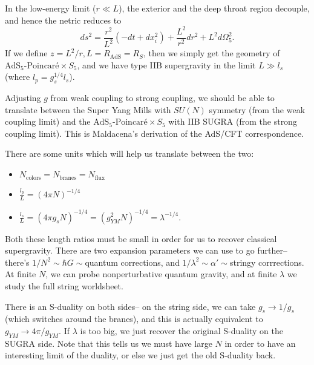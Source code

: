 In the low-energy limit ($r\ll L$), the exterior and the deep throat region decouple, and hence the netric reduces to
\begin{equation}
    ds^2= \frac{r^2}{L^2}(-dt+dx_i^2) +\frac{L^2}{r^2} dr^2+L^2 d\Omega_5^2.
\end{equation}
If we define $z=L^2/r, L=R_\text{AdS}=R_S$, then we simply get the geometry of $\text{AdS}_5\text{-Poincar\'e}\times S_5$, and we have type IIB supergravity in the limit $L\gg l_s$ (where $l_p= g_s^{1/4}l_s$).

Adjusting $g$ from weak coupling to strong coupling, we should be able to translate between the Super Yang Mills with $SU(N)$ symmetry (from the weak coupling limit) and the $\text{AdS}_5\text{-Poincar\'e}\times S_5$ with IIB SUGRA (from the strong coupling limit). This is Maldacena's derivation of the AdS/CFT correspondence.

There are some units which will help us translate between the two:
\begin{itemize}
    \item $N_\text{colors}=N_\text{branes}=N_\text{flux}$
    \item $\frac{l_p}{L}=(4\pi N)^{-1/4}$
    \item $\frac{l_s}{L}=(4\pi g_s N)^{-1/4} = (g_{YM}^2 N)^{-1/4}=\lambda^{-1/4}$.
\end{itemize}
Both these length ratios must be small in order for us to recover classical supergravity.
There are two expansion parameters we can use to go further-- there's $1/N^2 \sim \hbar G\sim{}$quantum corrections, and $1/\lambda^2 \sim \alpha' \sim{}$stringy corrrections. At finite $N$, we can probe nonperturbative quantum gravity, and at finite $\lambda$ we study the full string worldsheet.

There is an S-duality on both sides-- on the string side, we can take $g_s\to 1/g_s$ (which switches around the branes), and this is actually equivalent to $g_{YM} \to 4\pi/g_{YM}$. If $\lambda$ is too big, we just recover the original S-duality on the SUGRA side. Note that this tells us we must have large $N$ in order to have an interesting limit of the duality, or else we just get the old S-duality back.